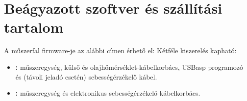 \section{Beágyazott szoftver és szállítási tartalom}
A műszerfal firmware-je az alábbi címen érhető el:
Kétféle kiszerelés kapható:
\begin{itemize}
    \item \textbf{\ReplicaGenOne{}:} műszeregység, külső és olajhőmérséklet-kábelkorbács, USBasp programozó és (távoli jeladó esetén) sebességérzékelő kábel.
    \item \textbf{\ReplicaNextLong{}:} műszeregység és elektronikus sebességérzékelő kábelkorbács.
\end{itemize}
